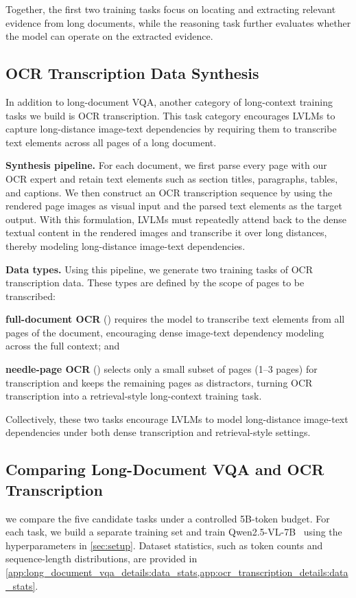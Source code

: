 {Together, the first two training tasks focus on locating and extracting relevant evidence from long documents, while the reasoning task further evaluates whether the model can operate on the extracted evidence.

\subsection{OCR Transcription Data Synthesis}
\label{sec:curation:ocr_transcription_method}
In addition to long-document VQA, another category of long-context training tasks we build is OCR transcription.
This task category encourages LVLMs to capture long-distance image-text dependencies by requiring them to transcribe text elements across all pages of a long document.

\noindent\textbf{Synthesis pipeline.}
For each document, we first parse every page with our OCR expert and retain text elements such as section titles, paragraphs, tables, and captions.
We then construct an OCR transcription sequence by using the rendered page images as visual input and the parsed text elements as the target output.
With this formulation, LVLMs must repeatedly attend back to the dense textual content in the rendered images and transcribe it over long distances, thereby modeling long-distance image-text dependencies.

\noindent\textbf{Data types.}
Using this pipeline, we generate two training tasks of OCR transcription data.
These types are defined by the scope of pages to be transcribed: \begin{inparaenum}[(i)]
\item \textbf{full-document OCR} (\ocrfull) requires the model to transcribe text elements from all pages of the document, encouraging dense image-text dependency modeling across the full context; and
\item \textbf{needle-page OCR} (\ocrneedle) selects only a small subset of pages (1--3 pages) for transcription and keeps the remaining pages as distractors, turning OCR transcription into a retrieval-style long-context training task.
\end{inparaenum}
Collectively, these two tasks encourage LVLMs to model long-distance image-text dependencies under both dense transcription and retrieval-style settings.

\subsection{Comparing Long-Document VQA and OCR Transcription}
\label{sec:curation:data_method_compare}
we compare the five candidate tasks under a controlled 5B-token budget. For each task, we build a separate training set and train Qwen2.5-VL-7B~\cite{bai2025qwen2} using the hyperparameters in \cref{sec:setup}. Dataset statistics, such as token counts and sequence-length distributions, are provided in \cref{app:long_document_vqa_details:data_stats,app:ocr_transcription_details:data_stats}.

}
